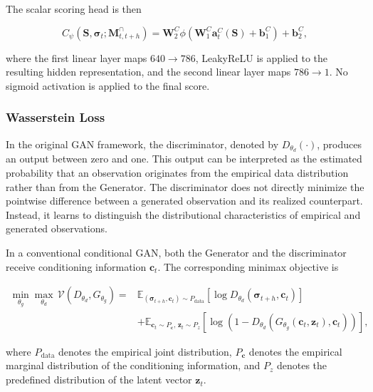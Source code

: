 The scalar scoring head is then

\begin{equation}\label{eq:ch3:critic_scoring_head}
C_{\psi}
\left(
\mathbf{S},
\boldsymbol{\sigma}_t;
\mathbf{M}^{\cap}_{t,t+h}
\right)
=
\mathbf{W}^{C}_2
\phi
\left(
\mathbf{W}^{C}_1
\mathbf{a}^{C}_t(\mathbf{S})
+
\mathbf{b}^{C}_1
\right)
+
\mathbf{b}^{C}_2,
\end{equation}

where the first linear layer maps $640\rightarrow786$, LeakyReLU is applied
to the resulting hidden representation, and the second linear layer maps
$786\rightarrow1$. No sigmoid activation is applied to the final score.






\subsubsection*{Wasserstein Loss}

In the original GAN framework, the discriminator, denoted by
$D_{\theta_d}(\cdot)$, produces an output between zero and one. This output
can be interpreted as the estimated probability that an observation originates
from the empirical data distribution rather than from the Generator. The
discriminator does not directly minimize the pointwise difference between a
generated observation and its realized counterpart. Instead, it learns to
distinguish the distributional characteristics of empirical and generated
observations.

In a conventional conditional GAN, both the Generator and the discriminator
receive conditioning information $\mathbf{c}_t$. The corresponding minimax
objective is

\begin{align}
\min_{\theta_g}\max_{\theta_d}\,
\mathcal{V}
\left(
D_{\theta_d},
G_{\theta_g}
\right)
={}&
\mathbb{E}_{
(\boldsymbol{\sigma}_{t+h},\mathbf{c}_t)
\sim P_{\mathrm{data}}
}
\left[
\log
D_{\theta_d}
\left(
\boldsymbol{\sigma}_{t+h},
\mathbf{c}_t
\right)
\right]
\nonumber\\
&+
\mathbb{E}_{
\mathbf{c}_t\sim P_{\mathbf{c}},
\,\mathbf{z}_t\sim P_z
}
\left[
\log
\left(
1-
D_{\theta_d}
\left(
G_{\theta_g}
\left(
\mathbf{c}_t,\mathbf{z}_t
\right),
\mathbf{c}_t
\right)
\right)
\right],
\label{eq:ch3:cgan_objective}
\end{align}

where $P_{\mathrm{data}}$ denotes the empirical joint distribution,
$P_{\mathbf{c}}$ denotes the empirical marginal distribution of the
conditioning information, and $P_z$ denotes the predefined distribution of
the latent vector $\mathbf{z}_t$.

